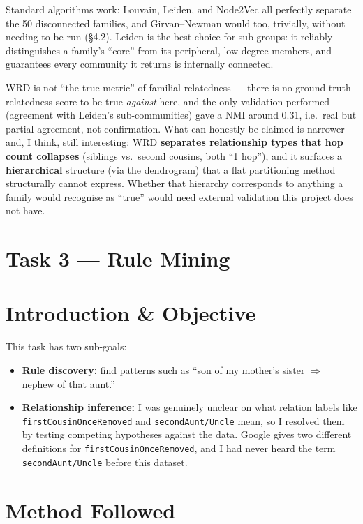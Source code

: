 \documentclass[11pt,a4paper]{article}
\newcommand{\rel}[1]{\texttt{\small #1}}
\newcounter{tasknum}
\newcommand{\starttask}[1]{%
  \clearpage
  \stepcounter{tasknum}%
  \setcounter{section}{0}%
  \setcounter{subsection}{0}%
  \section*{#1}%
  \addcontentsline{toc}{section}{#1}%
}
\begin{document}
Standard algorithms work: Louvain, Leiden, and Node2Vec all perfectly
separate the 50 disconnected families, and Girvan--Newman would too,
trivially, without needing to be run (\S4.2). Leiden is the best choice
for sub-groups: it reliably distinguishes a family's ``core'' from its
peripheral, low-degree members, and guarantees every community it returns
is internally connected.

WRD is not ``the true metric'' of familial relatedness --- there is no
ground-truth relatedness score to be true \emph{against} here, and the
only validation performed (agreement with Leiden's sub-communities) gave
a NMI around 0.31, i.e.\ real but partial agreement, not confirmation.
What can honestly be claimed is narrower and, I think, still
interesting: WRD \textbf{separates relationship types that hop count
collapses} (siblings vs.\ second cousins, both ``1 hop''), and it
surfaces a \textbf{hierarchical} structure (via the dendrogram) that a
flat partitioning method structurally cannot express. Whether that
hierarchy corresponds to anything a family would recognise as ``true''
would need external validation this project does not have.

\starttask{Task 3 --- Rule Mining}

\section{Introduction \& Objective}

This task has two sub-goals:

\begin{itemize}[leftmargin=1.4em,itemsep=2pt]
\item \textbf{Rule discovery:} find patterns such as ``son of my mother's
      sister $\Rightarrow$ nephew of that aunt.''
\item \textbf{Relationship inference:} I was genuinely unclear on what
      relation labels like \rel{firstCousinOnceRemoved} and
      \rel{secondAunt/Uncle} mean, so I resolved them by testing
      competing hypotheses against the data. Google gives two different
      definitions for \rel{firstCousinOnceRemoved}, and I had never heard
      the term \rel{secondAunt/Uncle} before this dataset.
\end{itemize}

\section{Method Followed}
\end{document}
